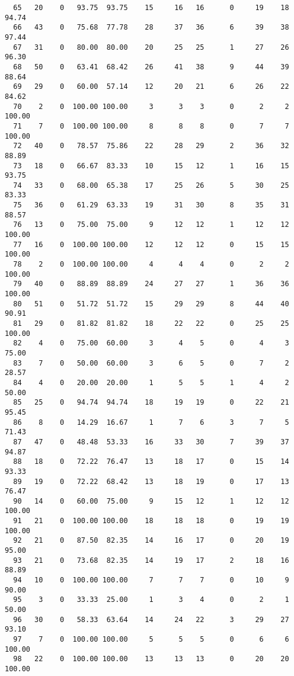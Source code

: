 \begin{verbatim}
  65   20    0   93.75  93.75    15     16   16      0     19    18    94.74
  66   43    0   75.68  77.78    28     37   36      6     39    38    97.44
  67   31    0   80.00  80.00    20     25   25      1     27    26    96.30
  68   50    0   63.41  68.42    26     41   38      9     44    39    88.64
  69   29    0   60.00  57.14    12     20   21      6     26    22    84.62
  70    2    0  100.00 100.00     3      3    3      0      2     2   100.00
  71    7    0  100.00 100.00     8      8    8      0      7     7   100.00
  72   40    0   78.57  75.86    22     28   29      2     36    32    88.89
  73   18    0   66.67  83.33    10     15   12      1     16    15    93.75
  74   33    0   68.00  65.38    17     25   26      5     30    25    83.33
  75   36    0   61.29  63.33    19     31   30      8     35    31    88.57
  76   13    0   75.00  75.00     9     12   12      1     12    12   100.00
  77   16    0  100.00 100.00    12     12   12      0     15    15   100.00
  78    2    0  100.00 100.00     4      4    4      0      2     2   100.00
  79   40    0   88.89  88.89    24     27   27      1     36    36   100.00
  80   51    0   51.72  51.72    15     29   29      8     44    40    90.91
  81   29    0   81.82  81.82    18     22   22      0     25    25   100.00
  82    4    0   75.00  60.00     3      4    5      0      4     3    75.00
  83    7    0   50.00  60.00     3      6    5      0      7     2    28.57
  84    4    0   20.00  20.00     1      5    5      1      4     2    50.00
  85   25    0   94.74  94.74    18     19   19      0     22    21    95.45
  86    8    0   14.29  16.67     1      7    6      3      7     5    71.43
  87   47    0   48.48  53.33    16     33   30      7     39    37    94.87
  88   18    0   72.22  76.47    13     18   17      0     15    14    93.33
  89   19    0   72.22  68.42    13     18   19      0     17    13    76.47
  90   14    0   60.00  75.00     9     15   12      1     12    12   100.00
  91   21    0  100.00 100.00    18     18   18      0     19    19   100.00
  92   21    0   87.50  82.35    14     16   17      0     20    19    95.00
  93   21    0   73.68  82.35    14     19   17      2     18    16    88.89
  94   10    0  100.00 100.00     7      7    7      0     10     9    90.00
  95    3    0   33.33  25.00     1      3    4      0      2     1    50.00
  96   30    0   58.33  63.64    14     24   22      3     29    27    93.10
  97    7    0  100.00 100.00     5      5    5      0      6     6   100.00
  98   22    0  100.00 100.00    13     13   13      0     20    20   100.00

\end{verbatim}
